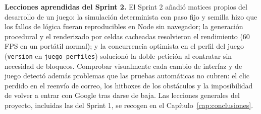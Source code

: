 \textbf{Lecciones aprendidas del Sprint 2.} El Sprint 2 añadió matices propios del desarrollo de un juego: la simulación determinista con paso fijo y semilla hizo que los fallos de lógica fueran reproducibles en Node sin navegador; la generación procedural y el renderizado por celdas cacheadas resolvieron el rendimiento (60 FPS en un portátil normal); y la concurrencia optimista en el perfil del juego (\texttt{version} en \texttt{juego\_perfiles}) solucionó la doble petición al contratar sin necesidad de bloqueos. Comprobar visualmente cada cambio de interfaz y de juego detectó además problemas que las pruebas automáticas no cubren: el clic perdido en el reenvío de correo, los hitboxes de los obstáculos y la imposibilidad de volver a entrar con Google tras darse de baja. Las lecciones generales del proyecto, incluidas las del Sprint 1, se recogen en el Capítulo~\ref{cap:conclusiones}.
